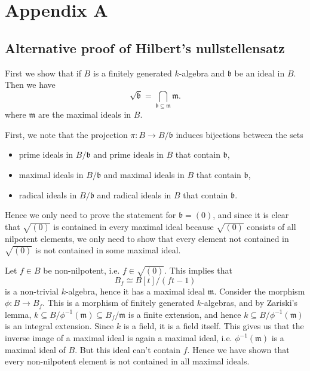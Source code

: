 \section{Appendix A}

\subsection{Alternative proof of Hilbert's nullstellensatz}
\label{A:pf:nullstellenzats}

First we show that if $B$ is a finitely generated $k$-algebra and $\mathfrak{b}$ be an ideal in $B$. Then we have
\begin{equation*}
    \sqrt{\mathfrak{b}} = \bigcap_{\mathfrak{b}\subseteq\mathfrak{m}}\mathfrak{m}.
\end{equation*}
where $\mathfrak{m}$ are the maximal ideals in $B$.

First, we note that the projection $\pi:B\rightarrow B/\mathfrak{b}$ induces bijections between the sets
\begin{itemize}
    \item prime ideals in $B/\mathfrak{b}$ and prime ideals in $B$ that contain $\mathfrak{b}$,
    \item maximal ideals in $B/\mathfrak{b}$ and maximal ideals in $B$ that contain $\mathfrak{b}$,
    \item radical ideals in $B/\mathfrak{b}$ and radical ideals in $B$ that contain $\mathfrak{b}$.
\end{itemize}
Hence we only need to prove the statement for $\mathfrak{b}=(0)$, and since it is clear that $\sqrt{(0)}$ is contained in every maximal ideal because $\sqrt{(0)}$ consists of all nilpotent elements, we only need to show that every element not contained in $\sqrt{(0)}$ is not contained in some maximal ideal. 

Let $f\in B$ be non-nilpotent, i.e. $f\in \sqrt{(0)}$. This implies that $$B_f\cong B[t]/(ft-1)$$ is a non-trivial $k$-algebra, hence it has a maximal ideal $\mathfrak{m}$. Consider the morphism $\phi: B \longrightarrow B_f$. This is a morphism of finitely generated $k$-algebras, and by Zariski's lemma, $k\subseteq B/\phi^{-1}(\mathfrak{m})\subseteq B_f/\mathfrak{m}$ is a finite extension, and hence $k\subseteq B/\phi^{-1}(\mathfrak{m})$ is an integral extension. Since $k$ is a field, it is a field itself. This gives us that the inverse image of a maximal ideal is again a maximal ideal, i.e. $\phi^{-1}(\mathfrak{m})$ is a maximal ideal of $B$. But this ideal can't contain $f$. Hence we have shown that every non-nilpotent element is not contained in all maximal ideals. 

